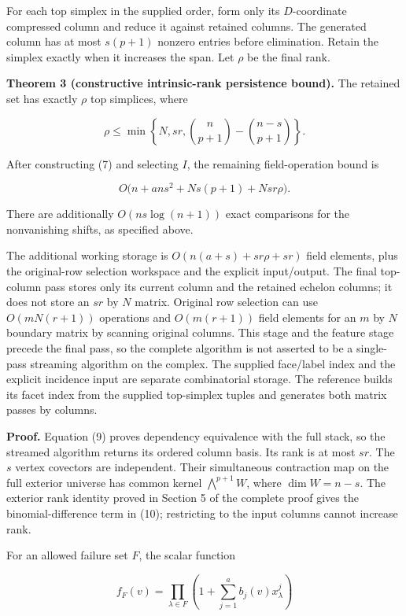 For each top simplex in the supplied order, form only its \(D\)-coordinate compressed column and reduce it against retained columns. The generated column has at most \(s(p+1)\) nonzero entries before elimination. Retain the simplex exactly when it increases the span. Let \(\rho\) be the final rank.

\textbf{Theorem 3 (constructive intrinsic-rank persistence bound).} The retained set has exactly \(\rho\) top simplices, where

\[
\rho\le\min\left\{N,sr,
          \binom n{p+1}-\binom{n-s}{p+1}\right\}.
\tag{10}
\]

After constructing (7) and selecting \(I\), the remaining field-operation bound is

\[
O\bigl(n+ans^2+Ns(p+1)+Nsr\rho\bigr).
\tag{11}
\]

There are additionally \(O(ns\log(n+1))\) exact comparisons for the nonvanishing shifts, as specified above.

The additional working storage is \(O(n(a+s)+sr\rho+sr)\) field elements, plus the original-row selection workspace and the explicit input/output. The final top-column pass stores only its current column and the retained echelon columns; it does not store an \(sr\) by \(N\) matrix. Original row selection can use \(O(mN(r+1))\) operations and \(O(m(r+1))\) field elements for an \(m\) by \(N\) boundary matrix by scanning original columns. This stage and the feature stage precede the final pass, so the complete algorithm is not asserted to be a single-pass streaming algorithm on the complex. The supplied face/label index and the explicit incidence input are separate combinatorial storage. The reference builds its facet index from the supplied top-simplex tuples and generates both matrix passes by columns.

\textbf{Proof.} Equation (9) proves dependency equivalence with the full stack, so the streamed algorithm returns its ordered column basis. Its rank is at most \(sr\). The \(s\) vertex covectors are independent. Their simultaneous contraction map on the full exterior universe has common kernel \(\bigwedge^{p+1}W\), where \(\dim W=n-s\). The exterior rank identity proved in Section 5 of the complete proof gives the binomial-difference term in (10); restricting to the input columns cannot increase rank.

For an allowed failure set \(F\), the scalar function

\[
f_F(v)=\prod_{\lambda\in F}
       \left(1+\sum_{j=1}^a b_j(v)x_\lambda^j\right)
\tag{12}
\]

